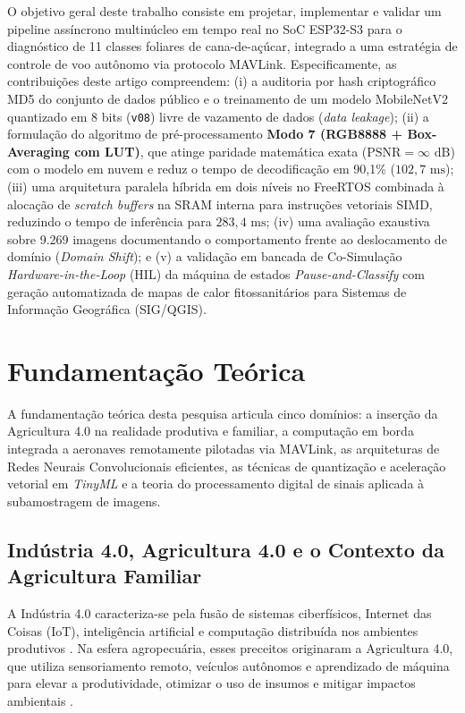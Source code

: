 \documentclass[12pt]{article}
\begin{document}
O objetivo geral deste trabalho consiste em projetar, implementar e validar um pipeline assíncrono multinúcleo em tempo real no SoC ESP32-S3 para o diagnóstico de 11 classes foliares de cana-de-açúcar, integrado a uma estratégia de controle de voo autônomo via protocolo MAVLink. Especificamente, as contribuições deste artigo compreendem: (i) a auditoria por hash criptográfico MD5 do conjunto de dados público e o treinamento de um modelo MobileNetV2 quantizado em 8 bits (\texttt{v08}) livre de vazamento de dados (\textit{data leakage}); (ii) a formulação do algoritmo de pré-processamento \textbf{Modo 7 (RGB8888 + Box-Averaging com LUT)}, que atinge paridade matemática exata ($\text{PSNR} = \infty\text{ dB}$) com o modelo em nuvem e reduz o tempo de decodificação em 90,1\% ($102,7\text{ ms}$); (iii) uma arquitetura paralela híbrida em dois níveis no FreeRTOS combinada à alocação de \textit{scratch buffers} na SRAM interna para instruções vetoriais SIMD, reduzindo o tempo de inferência para $283,4\text{ ms}$; (iv) uma avaliação exaustiva sobre 9.269 imagens documentando o comportamento frente ao deslocamento de domínio (\textit{Domain Shift}); e (v) a validação em bancada de Co-Simulação \textit{Hardware-in-the-Loop} (HIL) da máquina de estados \textit{Pause-and-Classify} com geração automatizada de mapas de calor fitossanitários para Sistemas de Informação Geográfica (SIG/QGIS).

\section{Fundamentação Teórica}

A fundamentação teórica desta pesquisa articula cinco domínios: a inserção da Agricultura 4.0 na realidade produtiva e familiar, a computação em borda integrada a aeronaves remotamente pilotadas via MAVLink, as arquiteturas de Redes Neurais Convolucionais eficientes, as técnicas de quantização e aceleração vetorial em \textit{TinyML} e a teoria do processamento digital de sinais aplicada à subamostragem de imagens.

\subsection{Indústria 4.0, Agricultura 4.0 e o Contexto da Agricultura Familiar}

A Indústria 4.0 caracteriza-se pela fusão de sistemas ciberfísicos, Internet das Coisas (IoT), inteligência artificial e computação distribuída nos ambientes produtivos \parencite{kagermann2013}. Na esfera agropecuária, esses preceitos originaram a Agricultura 4.0, que utiliza sensoriamento remoto, veículos autônomos e aprendizado de máquina para elevar a produtividade, otimizar o uso de insumos e mitigar impactos ambientais \parencite{lu2022,xu2023}.
\end{document}
